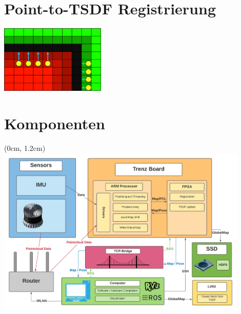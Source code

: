 \documentclass{beamer}
\begin{document}
\section{Point-to-TSDF Registrierung}
\begin{frame}{\secname}
\begin{center}
\includegraphics[width=5cm]{images/Reg_Gradient.png}
\end{center}
\end{frame}

\section{Komponenten}
\begin{frame}{\secname}
\begin{textblock*}{12.8cm}(0cm, 1.2cm)
\centering
\includegraphics[width=12cm]{images/Architecture.pdf}
\end{textblock*}
\end{frame}
\end{document}
